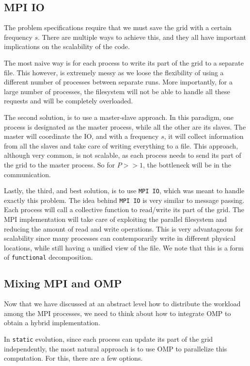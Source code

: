 \documentclass{report}
\begin{document}
\subsection{MPI IO}

The problem specifications require that we must save the grid with a certain 
frequency $s$. There are multiple ways to achieve this, and they all have 
important implications on the scalability of the code. 

The most naive way is for each process to write its part of the grid to a 
separate file. This however, is extremely messy as we loose the flexibility 
of using a different number of processes between separate runs. More importantly, 
for a large number of processes, the filesystem will not be able to handle all 
these requests and will be completely overloaded. 

The second solution, is to use a master-slave approach. In this paradigm, one 
process is designated as the master process, while all the other are its slaves. 
The master will coordinate the IO, and with a frequency $s$, it will collect 
information from all the slaves and take care of writing everything to a file. 
This approach, although very common, is not scalable, as each process needs to 
send its part of the grid to the master process. So for $P>>1$, the bottleneck 
will be in the communication. 

Lastly, the third, and best solution, is to use \texttt{MPI IO}, which was meant to handle 
exactly this problem. The idea behind \texttt{MPI IO} is very similar to message passing. 
Each process will call a collective function to read/write its part of the grid.
The MPI implementation will take care of exploiting the parallel filesystem
and reducing the amount of read and write operations. This is very advantageous 
for scalability since many processes can contemporarily write in different physical locations, 
while still having a unified view of the file. We note that this is a form 
of \texttt{functional} decomposition.

\subsection{Mixing MPI and OMP}

Now that we have discussed at an abstract level how to distribute the workload 
among the MPI processes, we need to think about how to integrate OMP to obtain 
a hybrid implementation. 

In \texttt{static} evolution, since each process can update its part of the grid 
independently, the most natural approach is to use OMP to parallelize this 
computation. For this, there are a few options. 
\end{document}
